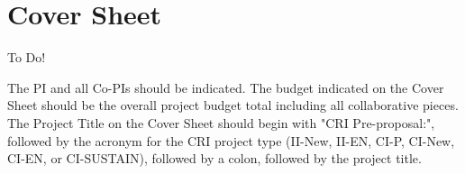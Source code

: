 

\section{Cover Sheet}

To Do!


The PI and all Co-PIs should be indicated. The budget indicated on 
the Cover Sheet should be the overall project budget total including 
all collaborative pieces. The Project Title on the Cover Sheet should 
begin with "CRI Pre-proposal:", followed by the acronym for the CRI 
project type (II-New, II-EN, CI-P, CI-New, CI-EN, or CI-SUSTAIN), 
followed by a colon, followed by the project title.


\newpage

